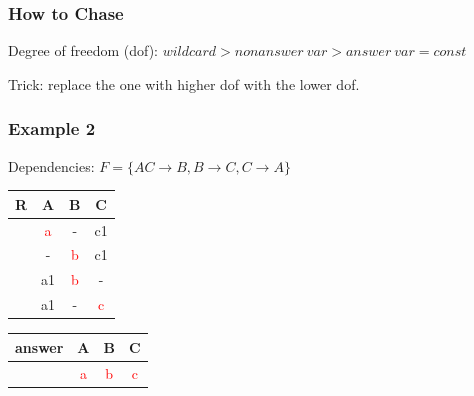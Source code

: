 \documentclass{beamer}
\begin{document}
\begin{frame}
  \frametitle{How to Chase}
  \begin{figure}[!htp]
\centering
{}
\end{figure}
\end{frame}

\begin{frame}
Degree of freedom (dof): $wildcard > nonanswer~var > answer~var = const$

Trick: replace the one with higher dof with the lower dof.
\end{frame}

\begin{frame}
  \frametitle{Example 2}
  Dependencies: $F = \{AC \rightarrow B, B \rightarrow C, C \rightarrow A \}$\\
  \begin{tabular}{ c | c c c}
  R & A & B & C \\
  \hline
  & \textcolor{red}{a}  & -  & c1 \\
  & -  & \textcolor{red}{b}  & c1 \\
  & a1 & \textcolor{red}{b} & - \\
  & a1 & - & \textcolor{red}{c} \\
  \end{tabular}
  \begin{tabular}{ c | c c c}
  answer & A & B & C \\
  \hline
   & \textcolor{red}{a}& \textcolor{red}{b}& \textcolor{red}{c}\\
  \end{tabular}
\end{frame}
\end{document}
